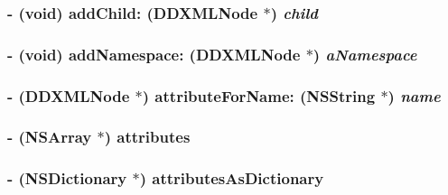 \label{class_d_d_x_m_l_element_a2a7ef778f931f0fa44e9992a67864957}
\hypertarget{class_d_d_x_m_l_element_aeeb3826c19f1cc0509d8436c61ea4c26}{
\subsubsection[{addChild:}]{\setlength{\rightskip}{0pt plus 5cm}-\/ (void) addChild: ({\bf DDXMLNode} $\ast$) {\em child}}}
\label{class_d_d_x_m_l_element_aeeb3826c19f1cc0509d8436c61ea4c26}
\hypertarget{class_d_d_x_m_l_element_a8945f6c9b65a5c3d76c68ab566e2bf08}{
\subsubsection[{addNamespace:}]{\setlength{\rightskip}{0pt plus 5cm}-\/ (void) addNamespace: ({\bf DDXMLNode} $\ast$) {\em aNamespace}}}
\label{class_d_d_x_m_l_element_a8945f6c9b65a5c3d76c68ab566e2bf08}
\hypertarget{class_d_d_x_m_l_element_a7d5e3634f6e1cdd6a0b7d23d17c0967e}{
\subsubsection[{attributeForName:}]{\setlength{\rightskip}{0pt plus 5cm}-\/ ({\bf DDXMLNode} $\ast$) attributeForName: ({\bf NSString} $\ast$) {\em name}}}
\label{class_d_d_x_m_l_element_a7d5e3634f6e1cdd6a0b7d23d17c0967e}
\hypertarget{class_d_d_x_m_l_element_a89366024e44ca50a7a8e76a06144d2a5}{
\subsubsection[{attributes}]{\setlength{\rightskip}{0pt plus 5cm}-\/ (NSArray $\ast$) attributes }}
\label{class_d_d_x_m_l_element_a89366024e44ca50a7a8e76a06144d2a5}
\hypertarget{class_d_d_x_m_l_element_a945ca3ee8a11c606522baca7f7766211}{
\subsubsection[{attributesAsDictionary}]{\setlength{\rightskip}{0pt plus 5cm}-\/ (NSDictionary $\ast$) attributesAsDictionary }}
